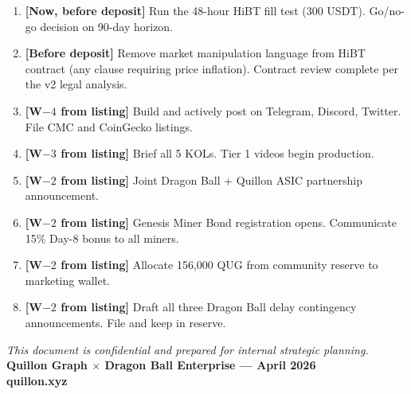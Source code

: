 \documentclass[11pt,a4paper]{article}
\begin{document}
\begin{enumerate}[leftmargin=1.5em]
  \item \textbf{[Now, before deposit]} Run the 48-hour HiBT fill test (300 USDT). Go/no-go decision on 90-day horizon.
  \item \textbf{[Before deposit]} Remove market manipulation language from HiBT contract (any clause requiring price inflation). Contract review complete per the v2 legal analysis.
  \item \textbf{[W$-4$ from listing]} Build and actively post on Telegram, Discord, Twitter. File CMC and CoinGecko listings.
  \item \textbf{[W$-3$ from listing]} Brief all 5 KOLs. Tier 1 videos begin production.
  \item \textbf{[W$-2$ from listing]} Joint Dragon Ball + Quillon ASIC partnership announcement.
  \item \textbf{[W$-2$ from listing]} Genesis Miner Bond registration opens. Communicate 15\% Day-8 bonus to all miners.
  \item \textbf{[W$-2$ from listing]} Allocate 156,000 QUG from community reserve to marketing wallet.
  \item \textbf{[W$-2$ from listing]} Draft all three Dragon Ball delay contingency announcements. File and keep in reserve.
\end{enumerate}

\vfill
\begin{center}
  \small\color{midgray}
  \textit{This document is confidential and prepared for internal strategic planning.}\\[4pt]
  \textbf{Quillon Graph $\times$ Dragon Ball Enterprise — April 2026}\\
  \textbf{quillon.xyz}
\end{center}
\end{document}
